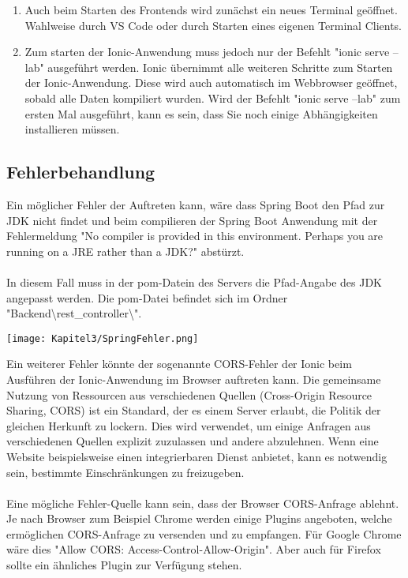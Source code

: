 \begin{enumerate}
    \item Auch beim Starten des Frontends wird zunächst ein neues Terminal geöffnet. Wahlweise durch VS Code oder durch Starten eines eigenen Terminal Clients. 
    
    \item Zum starten der Ionic-Anwendung muss jedoch nur der Befehlt "{}ionic serve --lab"{} ausgeführt werden. Ionic übernimmt alle weiteren Schritte zum Starten der Ionic-Anwendung. Diese wird auch automatisch im Webbrowser geöffnet, sobald alle Daten kompiliert wurden. Wird der Befehlt "{}ionic serve --lab"{} zum ersten Mal ausgeführt, kann es sein, dass Sie noch einige Abhängigkeiten installieren müssen.
    
\end{enumerate}

\subsection{Fehlerbehandlung}\label{SpringFehler}
Ein möglicher Fehler der Auftreten kann, wäre dass Spring Boot den Pfad zur JDK nicht findet und beim compilieren der Spring Boot Anwendung mit der Fehlermeldung "No compiler is provided in this environment. Perhaps you are running on a JRE rather than a JDK?"{} abstürzt. 
\\\\
In diesem Fall muss in der pom-Datein des Servers die Pfad-Angabe des JDK angepasst werden. Die pom-Datei befindet sich im Ordner "Backend\textbackslash{}rest\_controller\textbackslash{}"{}.

\begin{center}
    \begin{minipage}[t]{0.8\textwidth}
        \centering
        \texttt{[image: Kapitel3/SpringFehler.png]}
        \label{ContainerConfig}
    \end{minipage}
\end{center}
Ein weiterer Fehler könnte der sogenannte CORS-Fehler der Ionic beim Ausführen der Ionic-Anwendung im Browser auftreten kann. Die gemeinsame Nutzung von Ressourcen aus verschiedenen Quellen (Cross-Origin Resource Sharing, CORS) ist ein Standard, der es einem Server erlaubt, die Politik der gleichen Herkunft zu lockern. Dies wird verwendet, um einige Anfragen aus verschiedenen Quellen explizit zuzulassen und andere abzulehnen. Wenn eine Website beispielsweise einen integrierbaren Dienst anbietet, kann es notwendig sein, bestimmte Einschränkungen zu freizugeben. \cite{Mozilla.10.04.2020}\\\\Eine mögliche Fehler-Quelle kann sein, dass der Browser CORS-Anfrage ablehnt. Je nach Browser zum Beispiel Chrome werden einige Plugins angeboten, welche ermöglichen CORS-Anfrage zu versenden und zu empfangen. Für Google Chrome wäre dies "Allow CORS: Access-Control-Allow-Origin"{}. Aber auch für Firefox sollte ein ähnliches Plugin zur Verfügung stehen.